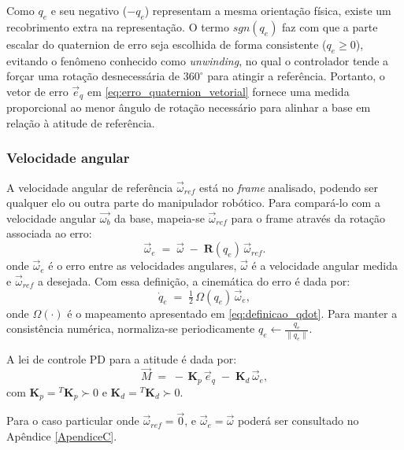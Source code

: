 Como $q_e$ e seu negativo ($-q_e$) representam a mesma orientação física, existe um recobrimento extra na representação.
O termo $sgn(q_{e})$ faz com que a parte escalar do quaternion de erro seja escolhida de forma consistente ($q_{e}\ge 0$), evitando o fenômeno conhecido como \emph{unwinding}, no qual o controlador tende a forçar uma rotação desnecessária de $360^{\circ}$ para atingir a referência.
Portanto, o vetor de erro $\vec e_q$ em \eqref{eq:erro_quaternion_vetorial} fornece uma medida proporcional ao menor ângulo de rotação necessário para alinhar a base em relação à atitude de referência.

\subsubsection{Velocidade angular}
A velocidade angular de referência $\vec \omega_{ref}$ está no \emph{frame} analisado, podendo ser qualquer elo ou outra parte do manipulador robótico.
Para compará-lo com a velocidade angular $\vec{\omega_b}$ da base, mapeia-se $\vec{\omega}_{ref}$ para o frame através da rotação associada ao erro:
\begin{equation}
\vec{\omega}_e \;=\; \vec{\omega} \;-\; \mathbf{R}(q_e)\,\vec{\omega}_{ref}.
\label{eq:omega_e}
\end{equation}
onde $\vec \omega_e$ é o erro entre as velocidades angulares, $\vec \omega$ é a velocidade angular medida e
$\vec \omega_{ref}$ a desejada.
Com essa definição, a cinemática do erro é dada por:
\begin{equation}
\dot{q}_e \;=\; \tfrac{1}{2}\,\Omega(q_e)\,\vec{\omega}_e,
\label{eq:qedot}
\end{equation}
onde $\Omega(\cdot)$ é o mapeamento apresentado em \eqref{eq:definicao_qdot}.
Para manter a consistência numérica, normaliza-se periodicamente $q_e \leftarrow \frac{q_e}{\|q_e\|}$.

A lei de controle PD para a atitude é dada por:
\begin{equation}
\vec{M} \;=\; -\,\mathbf{K}_p\,\vec{e}_q \;-\; \mathbf{K}_d\,\vec{\omega}_e,
\label{eq:controle_PD_fundamental}
\end{equation}
com $\mathbf{K}_p={}^T\mathbf{K}_p \succ 0$ e $\mathbf{K}_d={}^T\mathbf{K}_d \succ 0$.

Para o caso particular onde $\vec{\omega}_{ref}=\vec{0}$, e
$\vec{\omega}_e=\vec{\omega}$ poderá ser consultado no Apêndice \ref{ApendiceC}.

